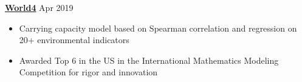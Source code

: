 \textbf{\href{https://github.com/gautomdas/IMMC-World4/blob/master/US-9365.pdf}{World4}} \hfill Apr 2019\par
\begin{itemize}
	\item Carrying capacity model based on Spearman correlation and regression on 20+ environmental indicators
	\item Awarded Top 6 in the US in the International Mathematics Modeling Competition for rigor and innovation
\end{itemize} \par